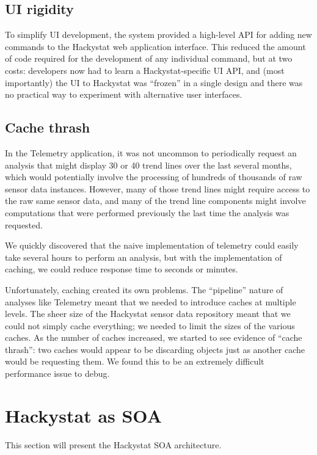 \documentclass[conference,compsoc,peerreview]{IEEEtran}
\begin{document}
\subsection{UI rigidity}

To simplify UI development, the system provided a high-level API for adding
new commands to the Hackystat web application interface.  This reduced the
amount of code required for the development of any individual command, but
at two costs: developers now had to learn a Hackystat-specific UI API, and
(most importantly) the UI to Hackystat was ``frozen'' in a single design
and there was no practical way to experiment with alternative user
interfaces.

\subsection{Cache thrash}

In the Telemetry application, it was not uncommon to periodically request an analysis that might display 30 or 40 trend lines over the last several months, which would potentially involve the processing of hundreds of thousands of raw sensor data instances. However, many of those trend lines might require access to the raw same sensor data, and many of the trend line components might involve computations that were performed previously the last time the analysis was requested.  

We quickly discovered that the naive implementation of telemetry could easily take several hours to perform an analysis, but with the implementation of caching, we could reduce response time to seconds or minutes.  

Unfortunately, caching created its own problems. The ``pipeline'' nature of analyses like Telemetry meant that we needed to introduce caches at multiple levels.  The sheer size of the Hackystat sensor data repository meant that we could not simply cache everything; we needed to limit the sizes of the various caches.  As the number of caches increased, we started to see evidence of ``cache thrash'': two caches would appear to be discarding objects just as another cache would be requesting them. We found this to be an extremely difficult performance issue to debug.


\section{Hackystat as SOA}
\label{sec:soa}

This section will present the Hackystat SOA architecture.
\end{document}
